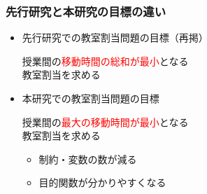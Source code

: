 \documentclass[dvipdfmx,12pt]{beamer}
\begin{document}
\begin{frame}\frametitle{先行研究と本研究の目標の違い}
\begin{itemize}
\vspace{-3pt}
\item 先行研究での教室割当問題の目標（再掲）\\
\vspace{-3pt}
\begin{screen}
\begin{center}
\vspace{-3pt}
{\large  授業間の\textcolor{red}{移動時間の総和が最小}となる}\\
{\large  教室割当を求める}\\
\vspace{-5pt}
\end{center}
\end{screen}

\item 本研究での教室割当問題の目標\\
\begin{screen}
\begin{center}
\vspace{-2pt}
{\large 授業間の\textcolor{red}{最大の移動時間が最小}となる}\\
{\large 教室割当を求める}\\
\vspace{-3pt}
\end{center}
\end{screen}
\vspace{-5pt}
\begin{itemize}
\item 制約・変数の数が減る
\item 目的関数が分かりやすくなる
\end{itemize}
\end{itemize}
\end{frame}
\end{document}
